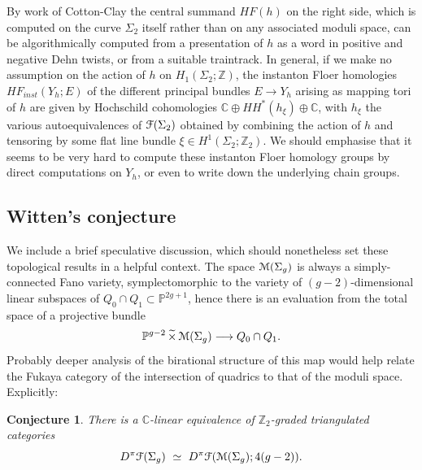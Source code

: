 \documentclass[reqno,10pt]{amsart}
\numberwithin{equation}{section}
\newcommand{\bC}{{\mathbb C}}
\newcommand{\bP}{{\mathbb P}}
\newcommand{\bZ}{{\mathbb Z}}
\newcommand{\scrF}{\EuScript{F}}
\newcommand{\scrM}{\EuScript{M}}
\newtheorem{Conjecture}[thm]{Conjecture}
\theoremstyle{remark}
\begin{document}
By work of Cotton-Clay \cite{Cotton-Clay} the central summand $HF(h)$ on the right side, which is computed on the curve $\Sigma_2$ itself rather than on any associated moduli space, can be algorithmically computed from  a presentation of $h$ as a word in positive and negative Dehn twists, or from a suitable traintrack.   In general, if we make no assumption on the action of $h$ on $H_1(\Sigma_2; \bZ)$, the instanton Floer homologies $HF_{inst}(Y_h; E)$ of the different principal bundles $E \rightarrow Y_h$ arising as mapping tori of $h$ are given by Hochschild cohomologies $\bC \oplus HH^*(h_{\xi}) \oplus \bC$, with $h_{\xi}$ the various autoequivalences of $\scrF(\Sigma_2)$  obtained by combining the action of $h$ and tensoring by some flat line bundle $\xi \in H^1(\Sigma_2;\bZ_2)$.  We should emphasise that it seems to be very hard to  compute these instanton Floer homology groups  by direct computations on $Y_h$, or even to write down the underlying chain groups.

\subsection{Witten's conjecture} \label{Sec:Speculative}

We include a brief speculative discussion, which should nonetheless set these topological results in a helpful context.  The space $\scrM(\Sigma_g)$ is always a simply-connected Fano variety, symplectomorphic to the variety of $(g-2)$-dimensional linear subspaces of $Q_0\cap Q_1 \subset \bP^{2g+1}$, hence there is an evaluation from the total space of a projective bundle
\[
\bP^{g-2} \, \widetilde{\times} \, \scrM(\Sigma_g) \longrightarrow Q_0\cap Q_1.
\]
Probably deeper analysis of the birational structure of this map would help relate the Fukaya category of the intersection of quadrics to that of the moduli space.  Explicitly:

\begin{Conjecture} \label{Conj:SecondHighest}
There is a $\bC$-linear equivalence of $\bZ_2$-graded triangulated categories
\[
D^{\pi} \scrF(\Sigma_g) \ \simeq \ D^{\pi} \scrF(\scrM(\Sigma_g); 4(g-2)).
\]
\end{Conjecture}
\end{document}
